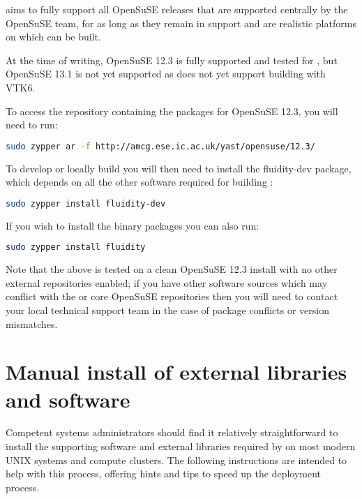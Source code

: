\fluidity aims to fully support all OpenSuSE releases that are supported
centrally by the OpenSuSE team, for as long as they remain in support and are
realistic platforms on which \fluidity can be built.

At the time of writing, OpenSuSE 12.3 is fully supported and tested for \fluidity,
but OpenSuSE 13.1 is not yet supported as \fluidity does not yet support building
with VTK6.

To access the repository containing the \fluidity packages for OpenSuSE 12.3, you
will need to run:

\begin{lstlisting}[language=bash]
sudo zypper ar -f http://amcg.ese.ic.ac.uk/yast/opensuse/12.3/
\end{lstlisting}

To develop or locally build \fluidity you will then need to install the
fluidity-dev package, which depends on all the other software required for
building \fluidity:

\begin{lstlisting}[language=bash]
sudo zypper install fluidity-dev
\end{lstlisting}

If you wish to install the \fluidity binary packages you can also run:

\begin{lstlisting}[language=bash]
sudo zypper install fluidity
\end{lstlisting}

Note that the above is tested on a clean OpenSuSE 12.3 install with no other
external repositories enabled; if you have other software sources which may
conflict with the \fluidity or core OpenSuSE repositories then you will need to
contact your local technical support team in the case of package conflicts or
version mismatches.

\section{Manual install of external libraries and software}
\label{sec:required_ḻibraries_manual_install}

Competent systems administrators should find it relatively straightforward to
install the supporting software and external libraries required by \fluidity on
most modern UNIX systems and compute clusters. The following instructions are
intended to help with this process, offering hints and tips to speed up the
deployment process.


